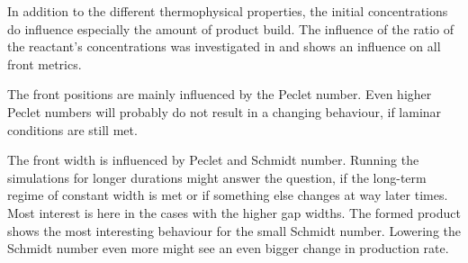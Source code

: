 \documentclass[../thesis.tex]{subfiles}
\begin{document}
In addition to the different thermophysical properties, the initial concentrations do influence especially the amount of product build. The influence of the ratio of the reactant's concentrations was investigated in \cite{comolli2021dynamics} and shows an influence on all front metrics.

The front positions are mainly influenced by the Peclet number. Even higher Peclet numbers will probably do not result in a changing behaviour, if laminar conditions are still met.

The front width is influenced by Peclet and Schmidt number. Running the simulations for longer durations might answer the question, if the long-term regime of constant width is met or if something else changes at way later times. Most interest is here in the cases with the higher gap widths.
The formed product shows the most interesting behaviour for the small Schmidt number. Lowering the Schmidt number even more might see an even bigger change in production rate.
\end{document}
